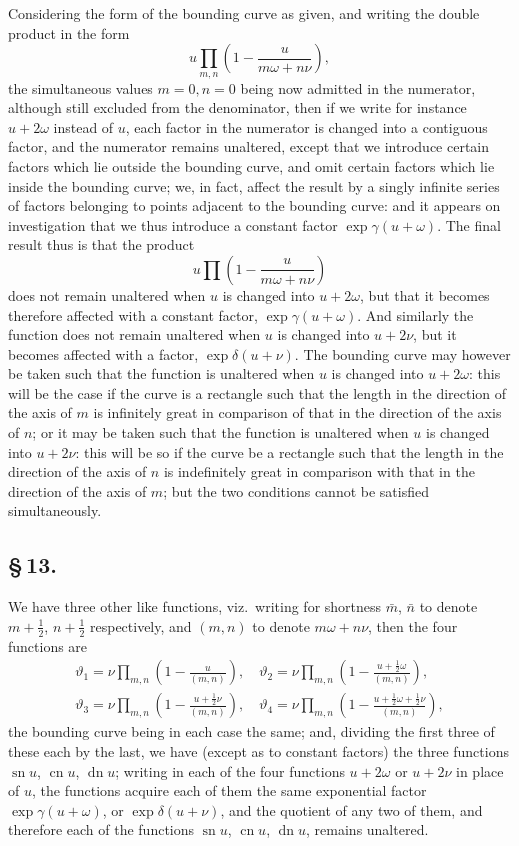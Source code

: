 \documentclass[11pt,a4paper]{article}
\DeclareMathOperator{\sn}{sn}
\DeclareMathOperator{\cn}{cn}
\DeclareMathOperator{\dn}{dn}
\begin{document}
Considering the form of the bounding curve as given, and writing the double product in the form
\[
u \prod_{m,n}\left(1 - \frac{u}{m\omega + n\nu}\right),
\]
the simultaneous values $m = 0, n = 0$ being now admitted in the numerator, although still excluded from the denominator, then if we write for instance $u + 2\omega$ instead of $u$, each factor in the numerator is changed into a contiguous factor, and the numerator remains unaltered, except that we introduce certain factors which lie outside the bounding curve, and omit certain factors which lie inside the bounding curve; we, in fact, affect the result by a singly infinite series of factors belonging to points adjacent to the bounding curve: and it appears on investigation that we thus introduce a constant factor $\exp\gamma(u + \omega)$. The final result thus is that the product
\[
u \prod\left(1 - \frac{u}{m\omega + n\nu}\right)
\]
does not remain unaltered when $u$ is changed into $u + 2\omega$, but that it becomes therefore affected with a constant factor, $\exp\gamma(u + \omega)$. And similarly the function does not remain unaltered when $u$ is changed into $u + 2\nu$, but it becomes affected with a factor, $\exp\delta(u + \nu)$. The bounding curve may however be taken such that the function is unaltered when $u$ is changed into $u + 2\omega$: this will be the case if the curve is a rectangle such that the length in the direction of the axis of $m$ is infinitely great in comparison of that in the direction of the axis of $n$; or it may be taken such that the function is unaltered when $u$ is changed into $u + 2\nu$: this will be so if the curve be a rectangle such that the length in the direction of the axis of $n$ is indefinitely great in comparison with that in the direction of the axis of $m$; but the two conditions cannot be satisfied simultaneously.

\subsection*{\S\,13.}

We have three other like functions, viz.\ writing for shortness $\bar{m}$, $\bar{n}$ to denote $m + \frac{1}{2}$, $n + \frac{1}{2}$ respectively, and $(m, n)$ to denote $m\omega + n\nu$, then the four functions are
\begin{multline*}
\vartheta_{1} = \nu \prod_{m,n}\left(1 - \frac{u}{(m, n)}\right), \quad
\vartheta_{2} = \nu \prod_{m,n}\left(1 - \frac{u + \frac{1}{2}\omega}{(m, n)}\right), \\
\vartheta_{3} = \nu \prod_{m,n}\left(1 - \frac{u + \frac{1}{2}\nu}{(m, n)}\right), \quad
\vartheta_{4} = \nu \prod_{m,n}\left(1 - \frac{u + \frac{1}{2}\omega + \frac{1}{2}\nu}{(m, n)}\right),
\end{multline*}
the bounding curve being in each case the same; and, dividing the first three of these each by the last, we have (except as to constant factors) the three functions $\sn u$, $\cn u$, $\dn u$; writing in each of the four functions $u + 2\omega$ or $u + 2\nu$ in place of $u$, the functions acquire each of them the same exponential factor $\exp\gamma(u + \omega)$, or $\exp\delta(u + \nu)$, and the quotient of any two of them, and therefore each of the functions $\sn u$, $\cn u$, $\dn u$, remains unaltered.
\end{document}
